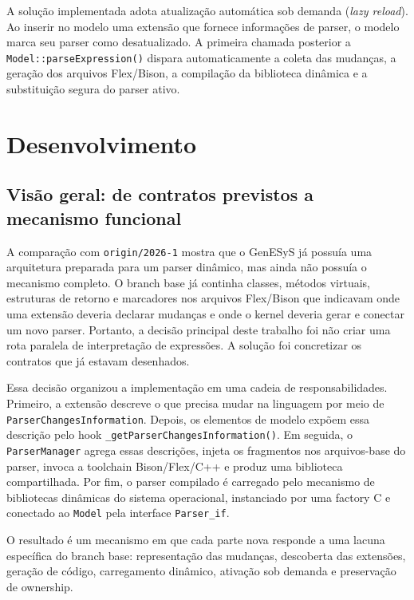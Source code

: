 \documentclass[12pt,a4paper]{article}
\begin{document}
A solu\c{c}\~ao implementada adota atualiza\c{c}\~ao autom\'atica sob demanda (\textit{lazy reload}). Ao inserir no modelo uma extens\~ao que fornece informa\c{c}\~oes de parser, o modelo marca seu parser como desatualizado. A primeira chamada posterior a \texttt{Model::parseExpression()} dispara automaticamente a coleta das mudan\c{c}as, a gera\c{c}\~ao dos arquivos Flex/Bison, a compila\c{c}\~ao da biblioteca din\^amica e a substitui\c{c}\~ao segura do parser ativo.

\section{Desenvolvimento}

\subsection{Vis\~ao geral: de contratos previstos a mecanismo funcional}

A compara\c{c}\~ao com \texttt{origin/2026-1} mostra que o GenESyS j\'a possu\'ia uma arquitetura preparada para um parser din\^amico, mas ainda n\~ao possu\'ia o mecanismo completo. O branch base j\'a continha classes, m\'etodos virtuais, estruturas de retorno e marcadores nos arquivos Flex/Bison que indicavam onde uma extens\~ao deveria declarar mudan\c{c}as e onde o kernel deveria gerar e conectar um novo parser. Portanto, a decis\~ao principal deste trabalho foi n\~ao criar uma rota paralela de interpreta\c{c}\~ao de express\~oes. A solu\c{c}\~ao foi concretizar os contratos que j\'a estavam desenhados.

Essa decis\~ao organizou a implementa\c{c}\~ao em uma cadeia de responsabilidades. Primeiro, a extens\~ao descreve o que precisa mudar na linguagem por meio de \texttt{ParserChangesInformation}. Depois, os elementos de modelo exp\~oem essa descri\c{c}\~ao pelo hook \texttt{\_getParserChangesInformation()}. Em seguida, o \texttt{ParserManager} agrega essas descri\c{c}\~oes, injeta os fragmentos nos arquivos-base do parser, invoca a toolchain Bison/Flex/C++ e produz uma biblioteca compartilhada. Por fim, o parser compilado \'e carregado pelo mecanismo de bibliotecas din\^amicas do sistema operacional, instanciado por uma factory C e conectado ao \texttt{Model} pela interface \texttt{Parser\_if}.

O resultado \'e um mecanismo em que cada parte nova responde a uma lacuna espec\'ifica do branch base: representa\c{c}\~ao das mudan\c{c}as, descoberta das extens\~oes, gera\c{c}\~ao de c\'odigo, carregamento din\^amico, ativa\c{c}\~ao sob demanda e preserva\c{c}\~ao de ownership.
\end{document}
